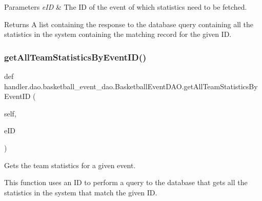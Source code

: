 \begin{DoxyParams}{Parameters}
{\em e\+ID} & The ID of the event of which statistics need to be fetched.\\
\hline
\end{DoxyParams}
\begin{DoxyReturn}{Returns}
A list containing the response to the database query containing all the statistics in the system containing the matching record for the given ID. 
\end{DoxyReturn}
\mbox{\label{classhandler_1_1dao_1_1basketball__event__dao_1_1_basketball_event_d_a_o_ac0e9abba73e012d31064e6fa69a97f45}} 
\subsubsection{\texorpdfstring{get\+All\+Team\+Statistics\+By\+Event\+I\+D()}{getAllTeamStatisticsByEventID()}}
{\footnotesize\ttfamily def handler.\+dao.\+basketball\+\_\+event\+\_\+dao.\+Basketball\+Event\+D\+A\+O.\+get\+All\+Team\+Statistics\+By\+Event\+ID (\begin{DoxyParamCaption}\item[{}]{self,  }\item[{}]{e\+ID }\end{DoxyParamCaption})}



Gets the team statistics for a given event. 

This function uses an ID to perform a query to the database that gets all the statistics in the system that match the given ID.



